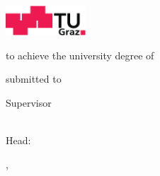 
\begin{titlepage}

{\sffamily

\begin{center}

\includegraphics[width=30mm]{figures/TU_Graz_Logo}

\vfill\vfill\vfill
\vfill\vfill\vfill

\myauthor

\vfill\vfill\vfill

{\LARGE\bfseries\mytitle}


\vfill\vfill\vfill
\vfill\vfill\vfill


{\bfseries\large\myworktitle}

to achieve the university degree of

\mygrade

\mydegreeprogramme


\vfill\vfill\vfill


submitted to

\vfill

{\bfseries\large\myuniversity}


\vfill\vfill\vfill


Supervisor

\mysupervisor

\vfill

\myinstitute\\
Head: \myinstitutehead\\

\vfill



\vfill\vfill\vfill


\mysubmissiontown, \mysubmissionmonth~\mysubmissionyear

\end{center}
}%
\end{titlepage}

\newpage

